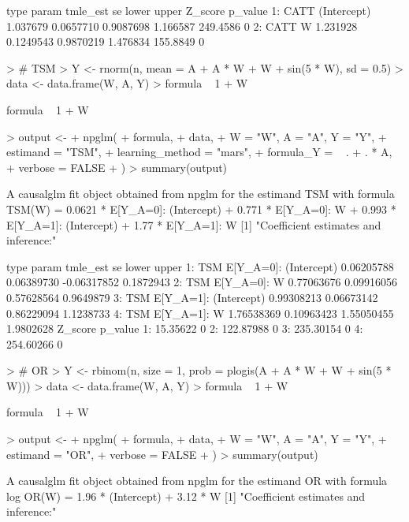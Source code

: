 \documentclass[article]{jss}
\begin{document}
\begin{Schunk}
\begin{Soutput}
   type       param tmle_est        se     lower    upper  Z_score p_value
1: CATT (Intercept) 1.037679 0.0657710 0.9087698 1.166587 249.4586       0
2: CATT           W 1.231928 0.1249543 0.9870219 1.476834 155.8849       0
\end{Soutput}
\begin{Sinput}
> # TSM
> Y <- rnorm(n, mean = A + A * W + W + sin(5 * W), sd = 0.5)
> data <- data.frame(W, A, Y)
> formula ~ 1 + W
\end{Sinput}
\begin{Soutput}
formula ~ 1 + W
\end{Soutput}
\begin{Sinput}
> output <-
+   npglm(
+     formula,
+     data,
+     W = "W", A = "A", Y = "Y",
+     estimand = "TSM",
+     learning_method = "mars",
+     formula_Y = ~ . + . * A,
+     verbose = FALSE
+   )
> summary(output)
\end{Sinput}
\begin{Soutput}
A causalglm fit object obtained from npglm for the estimand TSM with formula 
TSM(W) = 0.0621 * E[Y_{A=0}]: (Intercept) + 0.771 * E[Y_{A=0}]: W + 0.993 * E[Y_{A=1}]: (Intercept) + 1.77 * E[Y_{A=1}]: W
[1] "Coefficient estimates and inference:"

   type                   param   tmle_est         se       lower     upper
1:  TSM E[Y_{A=0}]: (Intercept) 0.06205788 0.06389730 -0.06317852 0.1872943
2:  TSM           E[Y_{A=0}]: W 0.77063676 0.09916056  0.57628564 0.9649879
3:  TSM E[Y_{A=1}]: (Intercept) 0.99308213 0.06673142  0.86229094 1.1238733
4:  TSM           E[Y_{A=1}]: W 1.76538369 0.10963423  1.55050455 1.9802628
     Z_score p_value
1:  15.35622       0
2: 122.87988       0
3: 235.30154       0
4: 254.60266       0
\end{Soutput}
\begin{Sinput}
> # OR
> Y <- rbinom(n, size = 1, prob = plogis(A + A * W + W + sin(5 * W)))
> data <- data.frame(W, A, Y)
> formula ~ 1 + W
\end{Sinput}
\begin{Soutput}
formula ~ 1 + W
\end{Soutput}
\begin{Sinput}
> output <-
+   npglm(
+     formula,
+     data,
+     W = "W", A = "A", Y = "Y",
+     estimand = "OR",
+     verbose = FALSE
+   )
> summary(output)
\end{Sinput}
\begin{Soutput}
A causalglm fit object obtained from npglm for the estimand OR with formula 
log OR(W) = 1.96 * (Intercept) + 3.12 * W
[1] "Coefficient estimates and inference:"


\end{Soutput}
\end{Schunk}
\end{document}
